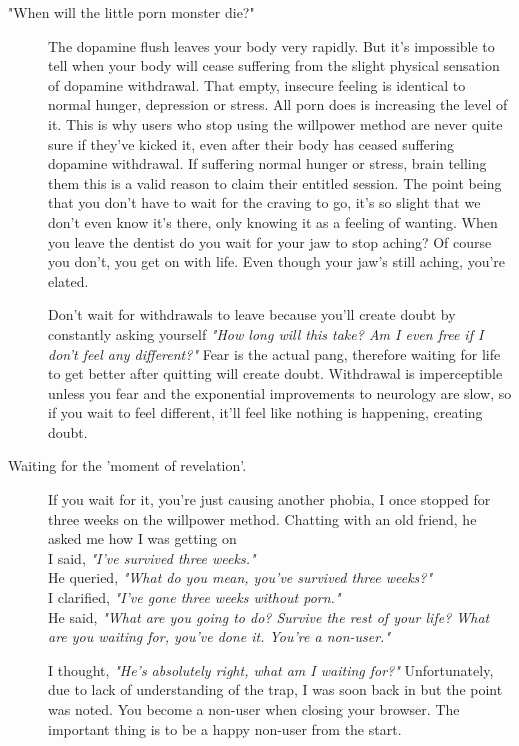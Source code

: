 \documentclass[easypeasy.tex]{subfiles}
\begin{document}
\begin{description}
\begin{description}
      \item["When will the little porn monster die?"]
        The dopamine flush leaves your body very rapidly. But it's impossible to tell when your body will cease suffering from the slight physical sensation of dopamine withdrawal. That empty, insecure feeling is identical to normal hunger, depression or stress. All porn does is increasing the level of it. This is why users who stop using the willpower method are never quite sure if they've kicked it, even after their body has ceased suffering dopamine withdrawal. If suffering normal hunger or stress, brain telling them this is a valid reason to claim their entitled session. The point being that you don't have to wait for the craving to go, it's so slight that we don't even know it's there, only knowing it as a feeling of wanting. When you leave the dentist do you wait for your jaw to stop aching? Of course you don't, you get on with life. Even though your jaw's still aching, you're elated.

        Don't wait for withdrawals to leave because you'll create doubt by constantly asking yourself \textit{"How long will this take? Am I even free if I don't feel any different?"} Fear is the actual pang, therefore waiting for life to get better after quitting will create doubt. Withdrawal is imperceptible unless you fear and the exponential improvements to neurology are slow, so if you wait to feel different, it'll feel like nothing is happening, creating doubt.

      \item [Waiting for the 'moment of revelation'.] If you wait for it, you're just causing another phobia, I once stopped for three weeks on the willpower method. Chatting with an old friend, he asked me how I was getting on \\
        I said, \textit{"I've survived three weeks."} \\
        He queried, \textit{"What do you mean, you've survived three weeks?"} \\
        I clarified, \textit{"I've gone three weeks without porn."} \\
        He said, \textit{"What are you going to do? Survive the rest of your life? What are you waiting for, you've done it. You're a non-user."}

        I thought, \textit{"He's absolutely right, what am I waiting for?"} Unfortunately, due to lack of understanding of the trap, I was soon back in but the point was noted. You become a non-user when closing your browser. The important thing is to be a happy non-user from the start.


\end{description}
\end{description}
\end{document}
